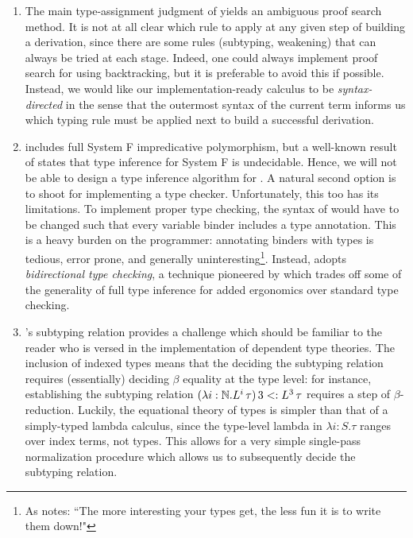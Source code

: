 \begin{enumerate}
  \item The main type-assignment judgment of \dlambdaamor yields an ambiguous proof search method. It is not at all clear which rule to apply at any given step of building a derivation, since there are some rules (subtyping, weakening) that can always be tried at each stage. Indeed, one could always implement proof search for \dlambdaamor using backtracking, but it is preferable to avoid this if possible. Instead, we would like our implementation-ready calculus \bilambdaamor to be \textit{syntax-directed} in the sense that the outermost syntax of the current term informs us which typing rule must be applied next to build a successful derivation. 
  
  \item \dlambdaamor includes full System F impredicative polymorphism, but a well-known result of \citet{wells:pal91} states that type inference for System F is undecidable. Hence, we will not be able to design a type inference algorithm for \dlambdaamor. A natural second option is to shoot for implementing a type checker. Unfortunately, this too has its limitations. To implement proper type checking, the syntax of \dlambdaamor would have to be changed such that every variable binder includes a type annotation. This is a heavy burden on the programmer: annotating binders with types is tedious, error prone, and generally uninteresting\footnote{
As \citet{pierce:lics03} notes: ``The more interesting your types get, the less fun it is to write them down!"
  }. Instead, \bilambdaamor adopts \textit{bidirectional type checking}, a technique pioneered by \cite{pierce-and-turner:lti} which trades off some of the generality of full type inference for added ergonomics over standard type checking.
  
  \item \dlambdaamor's subtyping relation provides a challenge which should be familiar to the reader who is versed in the implementation of dependent type theories. The inclusion of indexed types means that the deciding the subtyping relation requires (essentially) deciding $\beta$ equality at the type level: for instance, establishing the subtyping relation $(\lambda i : \mathbb{N}. L^i\, \tau) \, 3 <: L^3 \, \tau$ requires a step of $\beta$-reduction. Luckily, the equational theory of types is simpler than that of a simply-typed lambda calculus, since the type-level lambda in \dlambdaamor $\lambda i : S. \tau$ ranges over index terms, not types. This allows for a very simple single-pass normalization procedure which allows us to subsequently decide the subtyping relation.
  

\end{enumerate}
